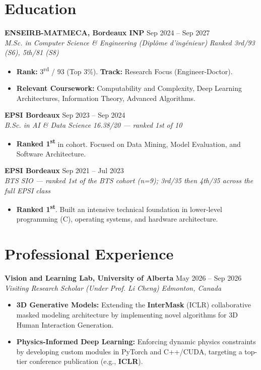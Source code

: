 \documentclass[10pt, letterpaper]{article}
\newcommand{\entry}[4]{
  \noindent \textbf{#1} \hfill #2 \\
  \textit{#3} \hfill \textit{#4} \par 
}
\begin{document}
\section{Education}

\entry{ENSEIRB-MATMECA, Bordeaux INP}{Sep 2024 -- Sep 2027}{M.Sc. in Computer Science \& Engineering (Diplôme d'ingénieur)}{Ranked 3rd/93 (S6), 5th/81 (S8)}
\begin{itemize}
    \item \textbf{Rank:} 3\textsuperscript{rd} / 93 (Top 3\%). \textbf{Track:} Research Focus (Engineer-Doctor).
    \item \textbf{Relevant Coursework:} Computability and Complexity, Deep Learning Architectures, Information Theory, Advanced Algorithms.
\end{itemize}

\vspace{6pt}

\entry{EPSI Bordeaux}{Sep 2023 -- Sep 2024}{B.Sc. in AI \& Data Science}{16.38/20 --- ranked 1st of 10}
\begin{itemize}
    \item \textbf{Ranked 1\textsuperscript{st}} in cohort. Focused on Data Mining, Model Evaluation, and Software Architecture.
\end{itemize}

\vspace{6pt}

\entry{EPSI Bordeaux}{Sep 2021 -- Jul 2023}{BTS SIO --- ranked 1st of the BTS cohort (n=9); 3rd/35 then 4th/35 across the full EPSI class}{}
\begin{itemize}
    \item \textbf{Ranked 1\textsuperscript{st}}. Built an intensive technical foundation in lower-level programming (C), operating systems, and hardware architecture.
\end{itemize}

\section{Professional Experience}

\entry{Vision and Learning Lab, University of Alberta}{May 2026 -- Sep 2026}{Visiting Research Scholar (Under Prof. Li Cheng)}{Edmonton, Canada}
\begin{itemize}
    \item \textbf{3D Generative Models:} Extending the \textbf{InterMask} (ICLR) collaborative masked modeling architecture by implementing novel algorithms for 3D Human Interaction Generation.
    \item \textbf{Physics-Informed Deep Learning:} Enforcing dynamic physics constraints by developing custom modules in PyTorch and C++/CUDA, targeting a top-tier conference publication (e.g., \textbf{ICLR}).
\end{itemize}
\end{document}
